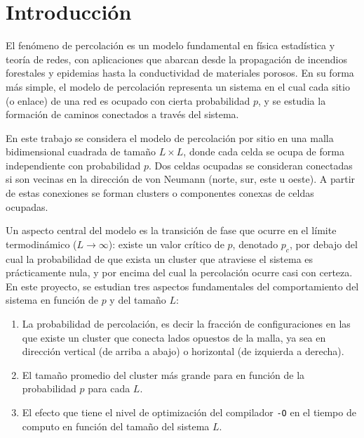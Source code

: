 \documentclass[%
 reprint,
 amsmath,amssymb,
 aps,
]{revtex4-2}
\begin{document}
\maketitle

\section{Introducción}

El fenómeno de percolación es un modelo fundamental en física estadística y teoría de redes, con aplicaciones que abarcan desde la propagación de incendios forestales y epidemias hasta la conductividad de materiales porosos. En su forma más simple, el modelo de percolación representa un sistema en el cual cada sitio (o enlace) de una red es ocupado con cierta probabilidad $p$, y se estudia la formación de caminos conectados a través del sistema.

En este trabajo se considera el modelo de percolación por sitio en una malla bidimensional cuadrada de tamaño $L \times L$, donde cada celda se ocupa de forma independiente con probabilidad $p$. Dos celdas ocupadas se consideran conectadas si son vecinas en la dirección de von Neumann (norte, sur, este u oeste). A partir de estas conexiones se forman clusters o componentes conexas de celdas ocupadas.

Un aspecto central del modelo es la transición de fase que ocurre en el límite termodinámico ($L \to \infty$): existe un valor crítico de $p$, denotado $p_c$, por debajo del cual la probabilidad de que exista un cluster que atraviese el sistema es prácticamente nula, y por encima del cual la percolación ocurre casi con certeza. En este proyecto, se estudian tres aspectos fundamentales del comportamiento del sistema en función de $p$ y del tamaño $L$:

\begin{enumerate}
    \item La probabilidad de percolación, es decir la fracción de configuraciones en las que existe un cluster que conecta lados opuestos de la malla, ya sea en dirección vertical (de arriba a abajo) o horizontal (de izquierda a derecha).
    \item El tamaño promedio del cluster más grande para en función de la probabilidad $p$ para cada $L$.
    \item El efecto que tiene el nivel de optimización del compilador \texttt{-O} en el tiempo de computo en función del tamaño del sistema $L$.
\end{enumerate}
\end{document}
